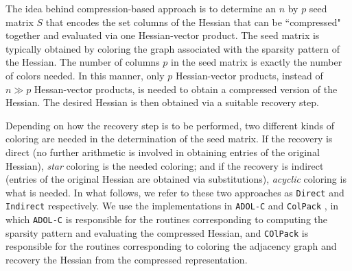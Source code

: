 \documentclass[final,leqno,onefignum,onetabnum]{siamart}
\begin{document}
The idea behind compression-based approach is to determine an $n$ by $p$ seed matrix $S$
that encodes the set columns of the Hessian that can be ``compressed" together and evaluated via one Hessian-vector product. The seed matrix is typically obtained by
coloring the graph associated with the sparsity pattern of the Hessian. 
The number of columns $p$ in the seed matrix is exactly the number of colors needed. 
In this manner, only $p$ Hessian-vector products, instead of $n \gg p$ Hessan-vector products, is needed to obtain a compressed version of the Hessian. The desired Hessian is then obtained via a suitable recovery step.  

Depending on how the recovery step is to be performed, two different kinds of coloring are needed in the determination of the seed matrix. If the recovery is direct (no further arithmetic is involved in obtaining entries of the original Hessian),  {\em star} coloring is the needed coloring;
and if the recovery is indirect (entries of the original Hessian are obtained via substitutions), {\em acyclic} coloring is what is needed. In what follows, we refer to these two approaches  as {\tt Direct} and {\tt Indirect} respectively. We use the implementations in {\tt ADOL-C} \cite{walther2009getting} and {\tt ColPack} \cite{gebremedhin2013colpack}, in which {\tt ADOL-C} is responsible for the routines corresponding to computing the sparsity pattern and evaluating the compressed Hessian, and {\tt COlPack} is responsible for the routines  corresponding to coloring the adjacency graph and recovery the Hessian from the compressed representation.
\end{document}
